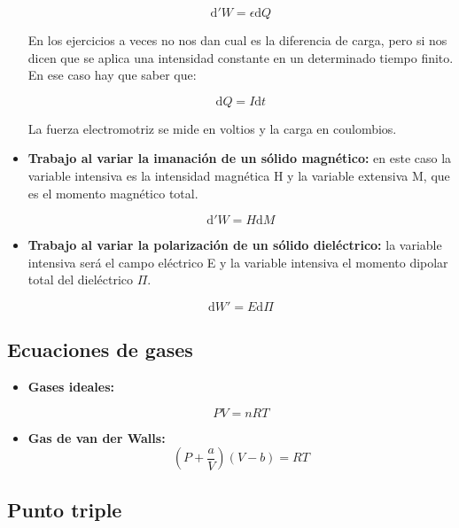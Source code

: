 \documentclass[12pt,a4paper]{article}
\newcommand{\D}{\mathrm{d}}
\newcommand{\parentesis}[1]{\left( #1 \right)}
\begin{document}
\begin{itemize}
\begin{equation}
\D' W = \epsilon \D Q
\end{equation}

En los ejercicios a veces no nos dan cual es la diferencia de carga, pero si nos dicen que se aplica una intensidad constante en un determinado tiempo finito. En ese caso hay que saber que:

$$ \D  Q =  I \D t $$

La fuerza electromotriz se mide en voltios y la carga en coulombios.

\item \textbf{Trabajo al variar la imanación de un sólido magnético:}  en este caso la variable intensiva es la intensidad magnética H y la variable extensiva M, que es el momento magnético total. 

\begin{equation}
\D ' W = H \D M
\end{equation}

\item \textbf{Trabajo al variar la polarización de un sólido dieléctrico:} la variable intensiva será  el campo eléctrico E y la variable intensiva el momento dipolar total del dieléctrico $\Pi$. 

\begin{equation}
\D W' = E \D \Pi
\end{equation}

\end{itemize}



\subsection{Ecuaciones de gases}

\begin{itemize}
\item \textbf{Gases ideales:} 

\begin{equation}
 P V = n R T 
\end{equation}

\item  \textbf{Gas de van der Walls:} 
\begin{equation}
\parentesis{P + \dfrac{a}{V}}(V-b)=RT
\end{equation}
\end{itemize}


\subsection{Punto triple \label{Sub:anex-punto-triple}}
\end{document}
